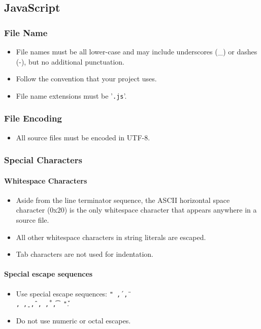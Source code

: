 \documentclass[a4paper, 11pt]{article}
\begin{document}
\subsection{JavaScript}
\subsubsection{File Name}
\begin{itemize}
\item File names must be all lower-case and may include underscores (\_) or dashes (-), but no additional punctuation.
\item Follow the convention that your project uses. 
\item File name extensions must be '\texttt{.js}'.
\end{itemize}

\subsubsection{File Encoding}
\begin{itemize}
\item All source files must be encoded in UTF-8.
\end{itemize}

\subsubsection{Special Characters}

\paragraph{Whitespace Characters}
\begin{itemize}
\item Aside from the line terminator sequence, the ASCII horizontal space character (0x20) is the only whitespace character that appears anywhere in a source file.
\item All other whitespace characters in string literals are escaped.
\item Tab characters are not used for indentation.
\end{itemize}

\paragraph{Special escape sequences}
\begin{itemize}
\item Use special escape sequences: \texttt{" \', \", \\, \b, \f, \n, \r, \t, \v "}.
\item Do not use numeric or octal escapes.
\end{itemize}
\end{document}
